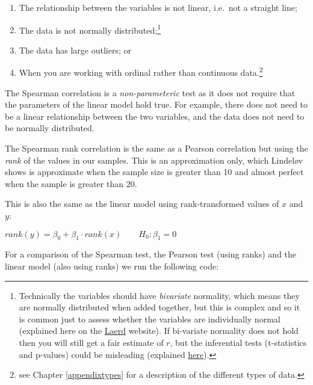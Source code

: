 \documentclass[
  12pt,
]{krantz}
\providecommand{\tightlist}{%
  \setlength{\itemsep}{0pt}\setlength{\parskip}{0pt}}
\begin{document}
\begin{enumerate}
\def\labelenumi{\arabic{enumi}.}
\tightlist
\item
  The relationship between the variables is not linear, i.e.~not a straight line;
\item
  The data is not normally distributed;\footnote{Technically the variables should have \emph{bivariate} normality, which means they are normally distributed when added together, but this is complex and so it is common just to assess whether the variables are individually normal (explained here on the \href{https://statistics.laerd.com/spss-tutorials/pearsons-product-moment-correlation-using-spss-statistics.php}{Laerd} website). If bi-variate normality does not hold then you will still get a fair estimate of \(r\), but the inferential tests (t-statistics and p-values) could be misleading (explained \href{https://www.researchgate.net/post/Why_should_data_be_normally_distributed_and_continuous_in_order_to_apply_Pearson_correlation}{here}).}
\item
  The data has large outliers; or
\item
  When you are working with ordinal rather than continuous data.\footnote{see Chapter \ref{appendixtypes} for a description of the different types of data.}
\end{enumerate}

The Spearman correlation is a \emph{non-parameteric} test as it does not require that the parameters of the linear model hold true. For example, there does not need to be a linear relationship between the two variables, and the data does not need to be normally distributed.

The Spearman rank correlation is the same as a Pearson correlation but using the \emph{rank} of the values in our samples. This is an approximation only, which Lindeløv shows is approximate when the sample size is greater than 10 and almost perfect when the sample is greater than 20.

This is also the same as the linear model using rank-transformed values of \(x\) and \(y\):

\begin{center}

\(rank(y) = \beta_0 + \beta_1 \cdot rank(x) \qquad H_0: \beta_1 = 0\)

\end{center}

For a comparison of the Spearman test, the Pearson test (using ranks) and the linear model (also using ranks) we run the following code:
\end{document}

